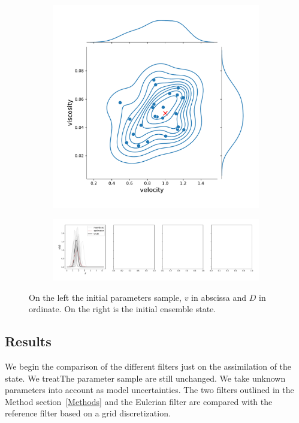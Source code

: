 \begin{figure}[ht!]
	\centering
	\begin{subfigure}{0.49\textwidth}
		\includegraphics[width=\textwidth]{images/app1d/param.pdf}
	\end{subfigure}
	\hfill
	\begin{subfigure}{0.49\textwidth}
		\includegraphics[width=\textwidth]{images/app1d/prior.pdf}
	\end{subfigure}
	\caption{On the left the initial parameters sample, $v$ in abscissa and $D$ in ordinate. On the right is the initial ensemble state.}
	\label{fig:initial_gen}
\end{figure}

\subsection{Results}

We begin the comparison of the different filters just on the assimilation of the state. We treatThe parameter sample are still unchanged. We take unknown parameters into account as model uncertainties. The two filters outlined in the Method section~\ref{Methods} and the Eulerian filter are compared with the reference filter based on a grid discretization.

